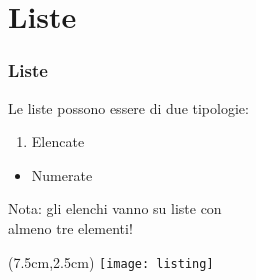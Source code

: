 \section{Liste}
\begin{frame}
 \frametitle{Liste}
 
 Le liste possono essere di due tipologie:
 \begin{enumerate}
  \item Elencate
 \end{enumerate}
 \begin{itemize}
  \item Numerate
 \end{itemize}

 Nota: gli elenchi vanno su liste con \\ almeno tre elementi!
 
 \begin{textblock*}{5cm}(7.5cm,2.5cm)
   \texttt{[image: listing]}
 \end{textblock*}

\end{frame}
